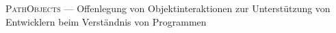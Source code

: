 \begin{minipage}[t]{\textwidth}

	\setlength{\parindent}{0pt}
	\setlength{\parskip}{1ex plus 0.5ex minus 0.2ex}

\begin{flushleft}
{\Large \textsc{PathObjects} --- Offenlegung von Objektinteraktionen zur Unterstützung von Entwicklern beim Verständnis von Programmen}
\end{flushleft}


\end{minipage}

